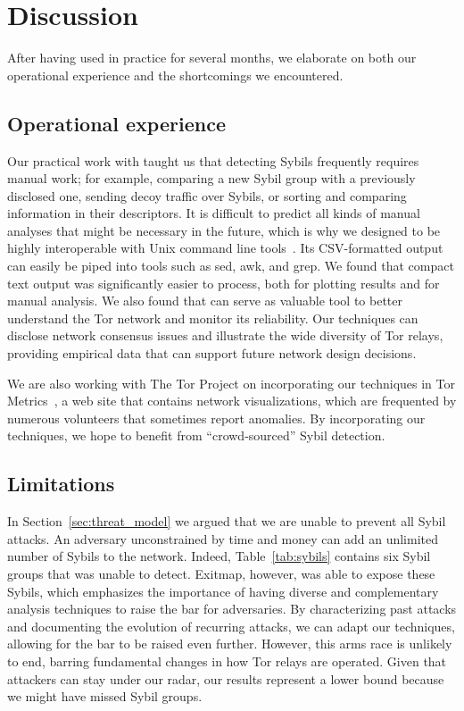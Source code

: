 \section{Discussion}
\label{sec:discussion}
After having used \sys in practice for several months, we elaborate on both our
operational experience and the shortcomings we encountered.

\subsection{Operational experience}
\label{sec:operational}
Our practical work with \sys taught us that detecting Sybils frequently requires
manual work; for example, comparing a new Sybil group with a previously
disclosed one, sending decoy traffic over Sybils, or sorting and comparing
information in their descriptors.  It is difficult to predict all kinds of
manual analyses that might be necessary in the future, which is why we designed
\sys to be highly interoperable with Unix command line tools~\cite{Pike1983a}.
Its CSV-formatted output can easily be piped into tools such as sed, awk, and
grep.  We found that compact text output was significantly easier to process,
both for plotting results and for manual analysis.  We also found that \sys can
serve as valuable tool to better understand the Tor network and monitor its
reliability.  Our techniques can disclose network consensus issues and
illustrate the wide diversity of Tor relays, providing empirical data that can
support future network design decisions.

We are also working with The Tor Project on incorporating our techniques in
Tor Metrics~\cite{metrics}, a web site that contains network visualizations,
which are frequented by numerous volunteers that sometimes report anomalies.
By incorporating our techniques, we hope to benefit from ``crowd-sourced'' Sybil
detection.

\subsection{Limitations}
\label{sec:limitations}
In Section~\ref{sec:threat_model} we argued that we are unable to prevent all
Sybil attacks.  An adversary unconstrained by time and money can add an
unlimited number of Sybils to the network.  Indeed, Table~\ref{tab:sybils}
contains six Sybil groups that \sys was unable to detect.  Exitmap, however, was
able to expose these Sybils, which emphasizes the importance of having diverse
and complementary analysis techniques to raise the bar for adversaries.  By
characterizing past attacks and documenting the evolution of recurring attacks,
we can adapt our techniques, allowing for the bar to be raised even further.
However, this arms race is unlikely to end, barring fundamental changes in how
Tor relays are operated.  Given that attackers can stay under our radar, our
results represent a lower bound because we might have missed Sybil groups.

